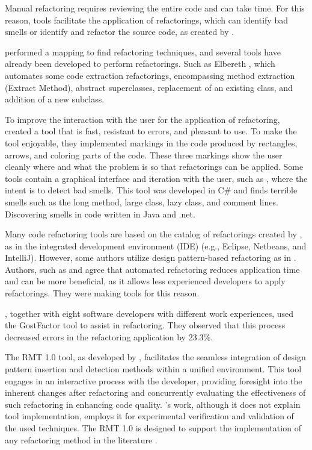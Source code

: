 Manual refactoring requires reviewing the entire code and can take time. For this reason, tools facilitate the application of refactorings, which can identify bad smells or identify and refactor the source code, as created by \textcite{beluzzo2018abordagem}.

\textcite{beluzzo2018abordagem} performed a mapping to find refactoring techniques, and several tools have already been developed to perform refactorings. Such as Elbereth \cite{korman1998elbereth}, which automates some code extraction refactorings, encompassing method extraction (Extract Method), abstract superclasses, replacement of an existing class, and addition of a new subclass.

To improve the interaction with the user for the application of refactoring, \cite{murphy2008breaking} created a tool that is fast, resistant to errors, and pleasant to use. To make the tool enjoyable, they implemented markings in the code produced by rectangles, arrows, and coloring parts of the code. These three markings show the user cleanly where and what the problem is so that refactorings can be applied.
Some tools contain a graphical interface and iteration with the user, such as \textcite{rani2014detection}, where the intent is to detect bad smells. This tool was developed in C\# and finds terrible smells such as the long method, large class, lazy class, and comment lines. Discovering smells in code written in Java and .net. 

Many code refactoring tools are based on the catalog of refactorings created by \textcite{fowler2018refactoring}, as in the integrated development environment (IDE) (e.g., Eclipse, Netbeans, and IntelliJ). However, some authors utilize design pattern-based refactoring as in . Authors, such as \textcite{cinneide2000automated} and \textcite{CHRISTOPOULOU20121201} agree that automated refactoring reduces application time and can be more beneficial, as it allows less experienced developers to apply refactorings. They were making tools for this reason.

\textcite{murphy2008breaking}, together with eight software developers with different work experiences, used the GostFactor tool to assist in refactoring. They observed that this process decreased errors in the refactoring application by 23.3\%.

The RMT 1.0 tool, as developed by \textcite{beluzzo2018abordagem}, facilitates the seamless integration of design pattern insertion and detection methods within a unified environment. This tool engages in an interactive process with the developer, providing foresight into the inherent changes after refactoring and concurrently evaluating the effectiveness of such refactoring in enhancing code quality. \textcite{sangeetha2019empirical} 's work, although it does not explain tool implementation, employs it for experimental verification and validation of the used techniques. The RMT 1.0 is designed to support the implementation of any refactoring method in the literature \cite{beluzzo2018abordagem}.

